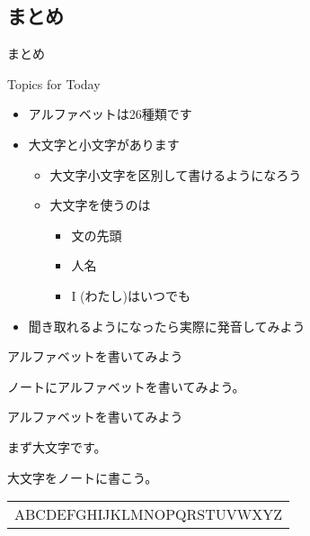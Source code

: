 \documentclass[aspectratio=169,xcolor={dvipsnames,table}]{beamer}
\begin{document}
\subsection{まとめ}
\begin{frame}[plain,label=matome]{まとめ}
  \begin{exampleblock}{Topics for Today}
\small
\pause
\begin{itemize}[square]
 \item アルファベットは26種類です\pause
 \item 大文字と小文字があります\pause
       \begin{itemize}
	\item 大文字小文字を区別して書けるようになろう\pause
        \item 大文字を使うのは\pause
              \begin{itemize}
	       \item 文の先頭\pause
	       \item 人名\pause
	       \item \textrm{I}\,\,(わたし)はいつでも\pause
	      \end{itemize}
       \end{itemize}
 \item 聞き取れるようになったら実際に発音してみよう
\end{itemize}
      \end{exampleblock}
\end{frame}
\begin{frame}[plain]{アルファベットを書いてみよう}

\Large

ノートにアルファベットを書いてみよう。

 \end{frame}
\begin{frame}[plain]{アルファベットを書いてみよう}
\LARGE

まず大文字です。

大文字をノートに書こう。

\bigskip

\begin{rmfamily}
\begin{tabular}{p{}}
ABCDEFGHIJKLMNOPQRSTUVWXYZ\\
\end{tabular}
\end{rmfamily}
\end{frame}
\end{document}
